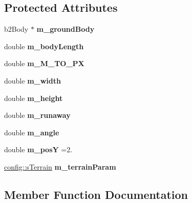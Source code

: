 \subsection*{Protected Attributes}
\begin{DoxyCompactItemize}
\item 
\mbox{\label{class_terrain_a4b1a5b1e598de229ea88bdef21ee7fbc}} 
b2\+Body $\ast$ {\bfseries m\+\_\+ground\+Body}
\item 
\mbox{\label{class_terrain_a92f36542edc1a5662bb07e6b7e459e56}} 
double {\bfseries m\+\_\+body\+Length}
\item 
\mbox{\label{class_terrain_ab4ad9370a342c622416df70bdcd1d1b6}} 
double {\bfseries m\+\_\+\+M\+\_\+\+T\+O\+\_\+\+PX}
\item 
\mbox{\label{class_terrain_aa41ca0c300d1f82566a6a3e78380b284}} 
double {\bfseries m\+\_\+width}
\item 
\mbox{\label{class_terrain_ab86d8eee1847a2c9bf048c7ddcb5d121}} 
double {\bfseries m\+\_\+height}
\item 
\mbox{\label{class_terrain_a9d8af4fbe1c713f6e582562465ec15f7}} 
double {\bfseries m\+\_\+runaway}
\item 
\mbox{\label{class_terrain_a3f3d3c1f5d75f1920d82ca36a9cc086b}} 
double {\bfseries m\+\_\+angle}
\item 
\mbox{\label{class_terrain_a03ab57eab744c95cc368646acb94ae7b}} 
double {\bfseries m\+\_\+posY} =2.
\item 
\mbox{\label{class_terrain_a8d3792a6911e30eb4ca67c5efd1002df}} 
\mbox{\hyperlink{structconfig_1_1s_terrain}{config\+::s\+Terrain}} {\bfseries m\+\_\+terrain\+Param}
\end{DoxyCompactItemize}


\subsection{Member Function Documentation}
\mbox{\label{class_terrain_ae7515dee9afa3b1cefac459abefb5442}} 
